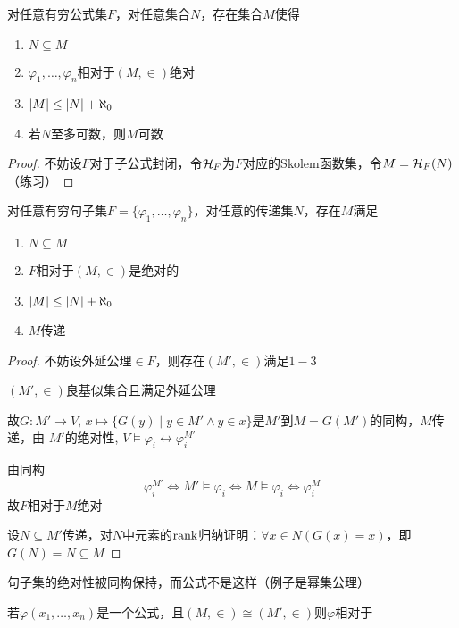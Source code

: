 \documentclass[11pt]{article}
\begin{document}
\begin{theorem}[ZFC]
对任意有穷公式集\(F\)，对任意集合\(N\)，存在集合\(M\)使得
\begin{enumerate}
\item \(N\subseteq M\)
\item \(\varphi_1,\dots,\varphi_n\)相对于\((M,\in)\)绝对
\item \(\abs{M}\le\abs{N}+\aleph_0\)
\item 若\(N\)至多可数，则\(M\)可数
\end{enumerate}
\end{theorem}

\begin{proof}
不妨设\(F\)对于子公式封闭，令\(\mathcal{H}_F\)为\(F\)对应的Skolem函数集，令\(M=\mathcal{H}_F(N)\) （练习）
\end{proof}

\begin{corollary}[ZFC]
对任意有穷句子集\(F=\{\varphi_1,\dots,\varphi_n\}\)，对任意的传递集\(N\)，存在\(M\)满足
\begin{enumerate}
\item \(N\subseteq M\)
\item \(F\)相对于\((M,\in)\)是绝对的
\item \(\abs{M}\le\abs{N}+\aleph_0\)
\item \(M\)传递
\end{enumerate}
\end{corollary}

\begin{proof}
不妨设外延公理\(\in F\)，则存在\((M',\in)\)满足\(1-3\)

\((M',\in)\)良基似集合且满足外延公理

故\(G:M'\to V\), \(x\mapsto\{G(y)\mid y\in M'\wedge y\in x\}\)是\(M'\)到\(M=G(M')\)的同构，\(M\)传递，由
\(M'\)的绝对性, \(V\vDash\varphi_i\leftrightarrow\varphi_i^{M'}\)

由同构
\begin{equation*}
\varphi_i^{M'}\Leftrightarrow M'\vDash\varphi_i\Leftrightarrow M\vDash\varphi_i\Leftrightarrow\varphi_i^M
\end{equation*}
故\(F\)相对于\(M\)绝对

设\(N\subseteq M'\)传递，对\(N\)中元素的\(\text{rank}\)归纳证明：\(\forall x\in N(G(x)=x)\)，即\(G(N)=N\subseteq M\)
\end{proof}

句子集的绝对性被同构保持，而公式不是这样（例子是幂集公理）

\begin{remark}
若\(\varphi(x_1,\dots,x_n)\)是一个公式，且\((M,\in)\cong(M',\in)\)则\(\varphi\)相对于
\end{remark}
\end{document}
